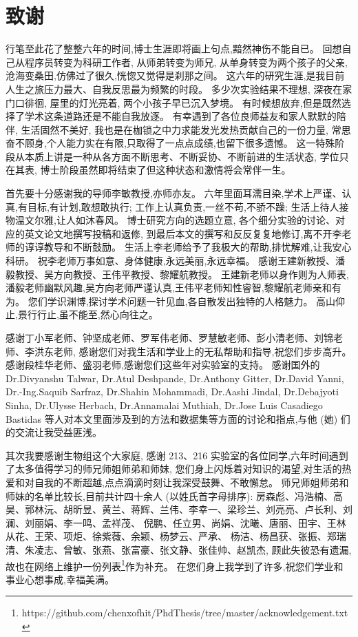 \section{致谢} %

行笔至此花了整整六年的时间,博士生涯即将画上句点,黯然神伤不能自已。
回想自己从程序员转变为科研工作者,
从师弟转变为师兄,
从单身转变为两个孩子的父亲,
沧海变桑田,仿佛过了很久,恍惚又觉得是刹那之间。
这六年的研究生涯,是我目前人生之旅压力最大、自我反思最为频繁的时段。
多少次实验结果不理想, 深夜在家门口徘徊, 屋里的灯光亮着, 两个小孩子早已沉入梦境。
有时候想放弃,但是既然选择了学术这条道路还是不能自我放逐。
有幸遇到了各位良师益友和家人默默的陪伴,
生活固然不美好, 我也是在枷锁之中力求能发光发热贡献自己的一份力量,
常思奋不顾身,个人能力实在有限,只取得了一点点成绩,也留下很多遗憾。
这一特殊阶段从本质上讲是一种从各方面不断思考、不断妥协、不断前进的生活状态,
学位只在其表,
博士阶段虽然即将结束了但这种状态和激情将会常伴一生。

首先要十分感谢我的导师李敏教授,亦师亦友。
六年里面耳濡目染,学术上严谨、认真,有目标,有计划,敢想敢执行;
工作上认真负责,一丝不苟,不骄不躁;
生活上待人接物温文尔雅,让人如沐春风。
博士研究方向的选题立意,
各个细分实验的讨论、对应的英文论文地撰写投稿和返修,
到最后本文的撰写和反反复复地修订,离不开李老师的谆谆教导和不断鼓励。
生活上李老师给予了我极大的帮助,排忧解难,让我安心科研。
祝李老师万事如意、身体健康,永远美丽,永远幸福。
感谢王建新教授、潘毅教授、吴方向教授、王伟平教授、黎耀航教授。
王建新老师以身作则为人师表,潘毅老师幽默风趣,吴方向老师严谨认真,王伟平老师知性睿智,黎耀航老师亲和有为。
您们学识渊博,探讨学术问题一针见血,各自散发出独特的人格魅力。
高山仰止,景行行止,虽不能至,然心向往之。

感谢丁小军老师、钟坚成老师、罗军伟老师、罗慧敏老师、彭小清老师、刘锦老师、李洪东老师,
感谢您们对我生活和学业上的无私帮助和指导,祝您们步步高升。
感谢段桂华老师、盛羽老师,感谢您们这些年对实验室的支持。
感谢国外的 Dr.Divyanshu Talwar, Dr.Atul Deshpande, Dr.Anthony Gitter, Dr.David Yanni,
 Dr.-Ing.Saquib Sarfraz, Dr.Shahin Mohammadi, Dr.Aashi Jindal, Dr.Debajyoti Sinha, Dr.Ulysse Herbach, Dr.Annamalai Muthiah, Dr.Jose Luis Casadiego Bastidas
等人对本文里面涉及到的方法和数据集等方面的讨论和指点,与他 (她) 们的交流让我受益匪浅。


其次我要感谢生物组这个大家庭,
感谢 213、216 实验室的各位同学,六年时间遇到了太多值得学习的师兄师姐师弟和师妹,
您们身上闪烁着对知识的渴望,对生活的热爱和对自我的不断超越,点点滴滴时刻让我深受鼓舞、不敢懈怠。
师兄师姐师弟和师妹的名单比较长,目前共计四十余人 (以姓氏首字母排序): 房森彪、冯浩楠、高昊、郭林沅、胡昕昱、黄兰、蒋辉、兰伟、李幸一、梁珍兰、刘亮亮、卢长利、刘澜、刘丽娟、李一鸣、孟祥茂、
倪鹏、任立男、尚娟、沈曦、唐丽、田宇、王林从花、王荣、项炬、徐紫薇、余颖、杨梦云、严承、 杨洁、杨昌获、张振、郑瑞清、朱凌志、曾敏、张燕、张富豪、张文静、张佳帅、赵凯杰,
顾此失彼恐有遗漏,故也在网络上维护一份列表\footnote{https://github.com/chenxofhit/PhdThesis/tree/master/acknowledgement.txt}作为补充。
在您们身上我学到了许多,祝您们学业和事业心想事成,幸福美满。

